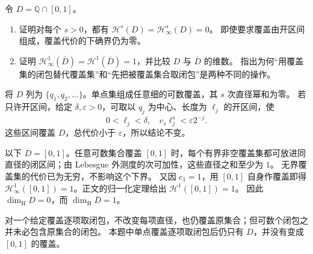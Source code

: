 \begin{exercise}\label{b1:ex:15-dense-countable-content}
令 \(D=\mathbb Q\cap[0,1]\)。
\begin{enumerate}
\item\label{b1:item:15-dense-countable-zero}
证明对每个 \(s>0\)，都有 \(\mathcal H^s(D)=\mathcal H^s_\infty(D)=0\)。
即使要求覆盖由开区间组成，覆盖代价的下确界仍为零。
\item\label{b1:item:15-closure-content-jump}
证明 \(\mathcal H^1_\infty(\overline D)=\mathcal H^1(\overline D)=1\)，并比较 \(D\) 与 \(\overline D\) 的维数。
指出为何“用覆盖集的闭包替代覆盖集”和“先把被覆盖集合取闭包”是两种不同的操作。
\end{enumerate}
\end{exercise}
\begin{solution}
将 \(D\) 列为 \(\{q_1,q_2,\ldots\}\)。单点集组成任意细的可数覆盖，其 \(s\) 次直径幂和为零。
若只许开区间，给定 \(\delta,\varepsilon>0\)，可取以 \(q_j\) 为中心、长度为 \(\ell_j\) 的开区间，使
\[
 0<\ell_j<\delta,
 \quad c_s\ell_j^s<\varepsilon 2^{-j}.
\]
这些区间覆盖 \(D\)，总代价小于 \(\varepsilon\)，所以结论不变。

以下 \(\overline D=[0,1]\)。任意可数集合覆盖 \([0,1]\) 时，每个有界非空覆盖集都可放进同直径的闭区间；由 Lebesgue 外测度的次可加性，这些直径之和至少为 \(1\)。
无界覆盖集的代价已为无穷，不影响这个下界。
又因 \(c_1=1\)，用 \([0,1]\) 自身作覆盖即得
\(\mathcal H^1_\infty([0,1])=1\)。正文的归一化定理给出 \(\mathcal H^1([0,1])=1\)。
因此 \(\dim_{\mathrm H}D=0\)，而 \(\dim_{\mathrm H}\overline D=1\)。

对一个给定覆盖逐项取闭包，不改变每项直径，也仍覆盖原集合；但可数个闭包之并未必包含原集合的闭包。
本题中单点覆盖逐项取闭包后仍只有 \(D\)，并没有变成 \([0,1]\) 的覆盖。
\end{solution}

